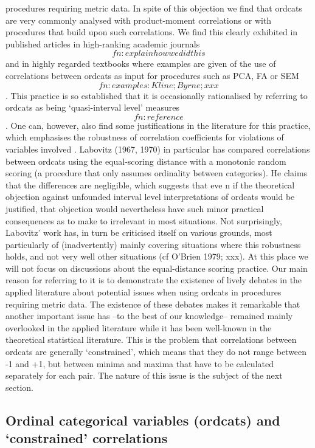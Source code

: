 \documentclass[
  12pt,
]{article}
\theoremstyle{plain}
\theoremstyle{definition}
\theoremstyle{remark}
\begin{document}
procedures requiring metric data. In spite of this objection we find
that ordcats are very commonly analysed with product-moment correlations
or with procedures that build upon such correlations. We find this
clearly exhibited in published articles in high-ranking academic
journals \[fn: explain how we did this\] and in highly regarded
textbooks where examples are given of the use of correlations between
ordcats as input for procedures such as PCA, FA or SEM
\[fn: examples: Kline; Byrne; xxx\]. This practice is so established
that it is occasionally rationalised by referring to ordcats as being
`quasi-interval level' measures \[fn: reference\]. One can, however,
also find some justifications in the literature for this practice, which
emphasises the robustness of correlation coefficients for violations of
variables involved . Labovitz (1967, 1970) in particular has compared
correlations between ordcats using the equal-scoring distance with a
monotonic random scoring (a procedure that only assumes ordinality
between categories). He claims that the differences are negligible,
which suggests that eve n if the theoretical objection against unfounded
interval level interpretations of ordcats would be justified, that
objection would nevertheless have such minor practical consequences as
to make to irrelevant in most situations. Not surprisingly, Labovitz'
work has, in turn be criticised itself on various grounds, most
particularly of (inadvertently) mainly covering situations where this
robustness holds, and not very well other situations (cf O'Brien 1979;
xxx). At this place we will not focus on discussions about the
equal-distance scoring practice. Our main reason for referring to it is
to demonstrate the existence of lively debates in the applied literature
about potential issues when using ordcats in procedures requiring metric
data. The existence of these debates makes it remarkable that another
important issue has --to the best of our knowledge-- remained mainly
overlooked in the applied literature while it has been well-known in the
theoretical statistical literature. This is the problem that
correlations between ordcats are generally `constrained', which means
that they do not range between -1 and +1, but between minima and maxima
that have to be calculated separately for each pair. The nature of this
issue is the subject of the next section.

\subsection{Ordinal categorical variables (ordcats) and `constrained'
correlations}\label{ordinal-categorical-variables-ordcats-and-constrained-correlations}
\end{document}
